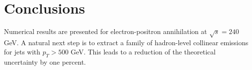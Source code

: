 \section{Conclusions}\label{sec:conclusions}

Numerical results are presented for electron-positron annihilation at
$\sqrt{s} = 240$ GeV. A natural next step is to extract a family of
hadron-level collinear emissions for jets with $p_T > 500$ GeV. This
leads to a reduction of the theoretical uncertainty by one percent.

